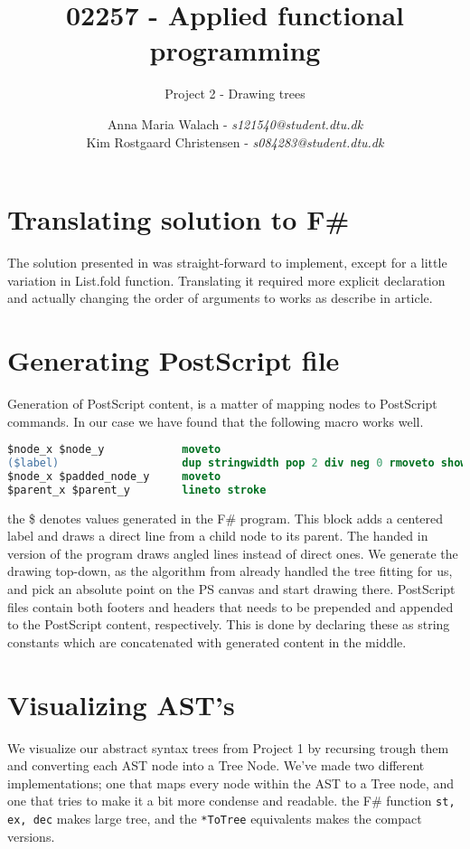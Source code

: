 \documentclass[10pt]{scrartcl}
\title{02257 - Applied functional programming}
\subtitle{Project 2 - Drawing trees}
\author{Anna Maria Walach - \textit {s121540@student.dtu.dk} \\ Kim Rostgaard Christensen - \textit {s084283@student.dtu.dk}}
\begin{document}
\maketitle
\section{Translating solution to F\#}
The solution presented in \cite{kennedy1996functional} was straight-forward to implement, except for a little variation in List.fold function. Translating it required more explicit declaration and actually changing the order of arguments to works as describe in article.
\section{Generating PostScript file}
Generation of PostScript content, is a matter of mapping nodes to PostScript commands. In our case we have found that the following macro works well.
\begin{lstlisting}[language=PostScript]
$node_x $node_y            moveto
($label)                   dup stringwidth pop 2 div neg 0 rmoveto show
$node_x $padded_node_y     moveto
$parent_x $parent_y        lineto stroke
\end{lstlisting}
the \$ denotes values generated in the F\# program. This block adds a centered label and draws a direct line from a child node to its parent. The handed in version of the program draws angled lines instead of direct ones.
We generate the drawing top-down, as the algorithm from \cite{kennedy1996functional} already handled the tree fitting for us, and pick an absolute point on the PS canvas and start drawing there.
PostScript files contain both footers and headers that needs to be prepended and appended to the PostScript content, respectively. This is done by declaring these as string constants which are concatenated with generated content in the middle.
\section{Visualizing AST's}
We visualize our abstract syntax trees from Project 1 by recursing trough them and converting each AST node into a Tree Node. We've made two different implementations; one that maps every node within the AST to a Tree node, and one that tries to make it a bit more condense and readable. the F\# function \texttt{st, ex, dec} makes large tree, and the \texttt{*ToTree} equivalents makes the compact versions.
\end{document}
